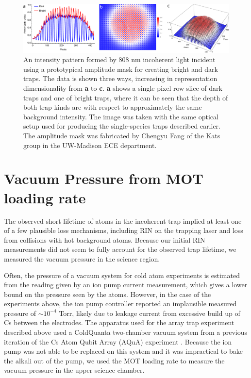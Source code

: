 \begin{figure}
    \centering
    \includegraphics[width=\textwidth]{Images/first_dual_species_trap_image.pdf}
    \caption{An intensity pattern formed by 808 nm incoherent light incident using a prototypical amplitude mask for creating bright and dark traps. The data is shown three ways, increasing in representation dimensionality from \textbf{a} to \textbf{c}. \textbf{a} shows a single pixel row slice of dark traps and one of bright traps, where it can be seen that the depth of both trap kinds are with respect to approximately the same background intensity. The image was taken with the same optical setup used for producing the single-species traps described earlier. The amplitude mask was fabricated by Chengyu Fang of the Kats group in the UW-Madison ECE department.}
    \label{fig:dual_species_traps}
\end{figure}

\section{Vacuum Pressure from MOT loading rate}

The observed short lifetime of atoms in the incoherent trap implied at least one of a few plausible loss mechanisms, including RIN on the trapping laser and loss from collisions with hot background atoms. Because our initial RIN measurements did not seem to fully account for the observed trap lifetime, we measured the vacuum pressure in the science region. 

Often, the pressure of a vacuum system for cold atom experiments is estimated from the reading given by an ion pump current measurement, which gives a lower bound on the pressure seen by the atoms. However, in the case of the experiments above, the ion pump controller reported an implausible measured pressure of $\sim 10^{-4}$ Torr, likely due to leakage current from excessive build up of Cs between the electrodes. The apparatus used for the array trap experiment described above used a ColdQuanta two-chamber vacuum system from a previous iteration of the Cs Atom Qubit Array (AQuA) experiment \cite{Graham2018}. Because the ion pump was not able to be replaced on this system and it was impractical to bake the alkali out of the pump, we used the MOT loading rate to measure the vacuum pressure in the upper science chamber.  

